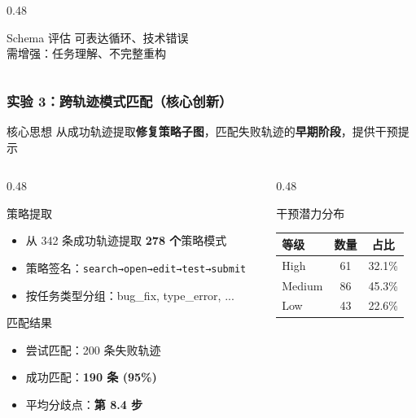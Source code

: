 \documentclass[aspectratio=169,10pt]{beamer}
\begin{document}
\begin{frame}
\begin{columns}[T]
\begin{column}{0.48\textwidth}
      \begin{alertblock}{Schema 评估}
        \textcolor{darkgreen}{} 可表达循环、技术错误\\
        \textcolor{red}{} 需增强：任务理解、不完整重构
      \end{alertblock}
    \end{column}
  \end{columns}
\end{frame}

\begin{frame}
  \frametitle{实验 3：跨轨迹模式匹配（核心创新）}

  \begin{block}{核心思想}
    从成功轨迹提取\textbf{修复策略子图}，匹配失败轨迹的\textbf{早期阶段}，提供干预提示
  \end{block}

  \begin{columns}[T]
    \begin{column}{0.48\textwidth}
      \begin{block}{策略提取}
        \begin{itemize}
          \item 从 342 条成功轨迹提取 \textbf{278 个}策略模式
          \item 策略签名：\texttt{search→open→edit→test→submit}
          \item 按任务类型分组：bug\_fix, type\_error, ...
        \end{itemize}
      \end{block}

      \begin{block}{匹配结果}
        \begin{itemize}
          \item 尝试匹配：200 条失败轨迹
          \item 成功匹配：\textbf{190 条 (95\%)}
          \item 平均分歧点：\textbf{第 8.4 步}
        \end{itemize}
      \end{block}
    \end{column}

    \begin{column}{0.48\textwidth}
      \begin{block}{干预潜力分布}
        \begin{tabular}{l|c|c}
          \textbf{等级} & \textbf{数量} & \textbf{占比} \\
          \hline
          High & 61 & 32.1\% \\
          Medium & 86 & 45.3\% \\
          Low & 43 & 22.6\% \\
        \end{tabular}


\end{block}
\end{column}
\end{columns}
\end{frame}
\end{document}
